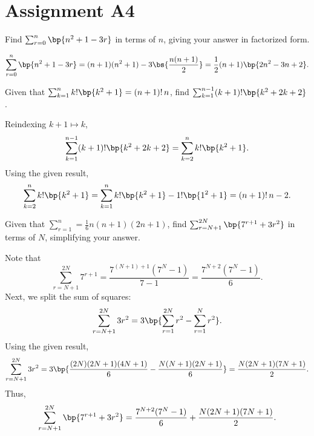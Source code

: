 \section{Assignment A4}

\begin{problem}
    Find $\sum_{r = 0}^n \bp{n^2 + 1 - 3r}$ in terms of $n$, giving your answer in factorized form.
\end{problem}
\begin{solution}
    \[\sum_{r = 0}^n \bp{n^2 + 1 - 3r} = (n+1)(n^2 + 1) - 3 \bs{\frac{n(n+1)}2} = \frac12 (n+1)\bp{2n^2 - 3n + 2}.\]
\end{solution}

\begin{problem}
    Given that $\sum_{k=1}^n k!\bp{k^2 + 1} = (n+1)!\,n$, find $\sum_{k=1}^{n-1} (k+1)!\bp{k^2 + 2k + 2}$.
\end{problem}
\begin{solution}
    Reindexing $k+1 \mapsto k$,
    \[\sum_{k=1}^{n-1} (k+1)!\bp{k^2 + 2k + 2} = \sum_{k=2}^{n} k! \bp{k^2 + 1}.\] Using the given result, \[\sum_{k=2}^{n} k! \bp{k^2 + 1} = \sum_{k=1}^{n} k! \bp{k^2 + 1} - 1! \bp{1^2 + 1} = (n+1)! \, n - 2.\]
\end{solution}

\begin{problem}
    Given that $\sum_{r=1}^n = \frac16 n(n+1)(2n+1)$, find $\sum_{r=N+1}^{2N} \bp{7^{r+1} + 3r^2}$ in terms of $N$, simplifying your answer.
\end{problem}
\begin{solution}
    Note that \[\sum_{r=N+1}^{2N} 7^{r+1} = \frac{7^{(N+1)+1}(7^N - 1)}{7-1} = \frac{7^{N+2}(7^N - 1)}{6}.\] Next, we split the sum of squares: \[\sum_{r=N+1}^{2N} 3r^2 = 3\bp{\sum_{r=1}^{2N} r^2 - \sum_{r=1}^{N} r^2}.\] Using the given result, \[\sum_{r=N+1}^{2N} 3r^2 = 3\bp{\frac{(2N)(2N+1)(4N + 1)}6 - \frac{N(N+1)(2N+1)}6} = \frac{N(2N+1)(7N+1)}{2}.\] Thus, \[\sum_{r=N+1}^{2N} \bp{7^{r+1} + 3r^2} = \frac{7^{N+2}(7^N - 1)}{6} + \frac{N(2N+1)(7N+1)}{2}.\]
\end{solution}

